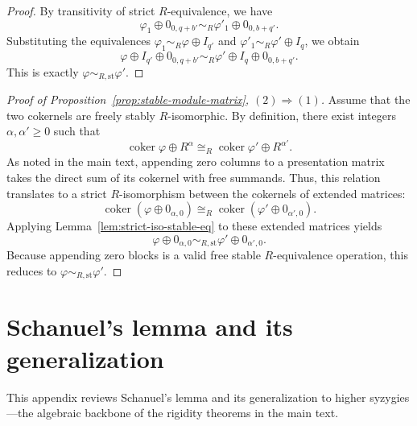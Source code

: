 \documentclass[aps,prx,english,superscriptaddress,twocolumn,tightenlines,showpacs,longbibliography,floatfix,amsfonts]{revtex4-2}
\theoremstyle{remark}
\theoremstyle{definition}
\begin{document}
\begin{proof}
	By transitivity of strict \(R\)-equivalence, we have
	\begin{equation}
		\varphi_1 \oplus 0_{0, q+b'} \sim_R \varphi'_1 \oplus 0_{0, b+q'}.
	\end{equation}
	Substituting the equivalences $\varphi_1 \sim_R \varphi \oplus I_{q'}$ and $\varphi'_1 \sim_R \varphi' \oplus I_q$, we obtain
	\begin{equation}
		\varphi \oplus I_{q'} \oplus 0_{0, q+b'} \sim_R \varphi' \oplus I_q \oplus 0_{0, b+q'}.
	\end{equation}
	This is exactly \(\varphi \sim_{R,\mathrm{st}} \varphi'\).
\end{proof}

\begin{proof}[Proof of Proposition~\ref{prop:stable-module-matrix}, $(2) \Rightarrow (1)$]
	Assume that the two cokernels are freely stably \(R\)-isomorphic. By
	definition, there exist integers
	$\alpha,\alpha'\geq0$ such that
	\begin{equation}
		\operatorname{coker}\varphi \oplus R^\alpha \cong_R \operatorname{coker}\varphi' \oplus R^{\alpha'}.
	\end{equation}
	As noted in the main text, appending zero columns to a presentation matrix takes the direct sum of its cokernel with free summands. Thus, this relation translates to a strict \(R\)-isomorphism between the cokernels of extended matrices:
	\begin{equation}
		\operatorname{coker}(\varphi \oplus 0_{\alpha, 0}) \cong_R \operatorname{coker}(\varphi' \oplus 0_{\alpha', 0}).
	\end{equation}
	Applying Lemma~\ref{lem:strict-iso-stable-eq} to these extended matrices yields
	\begin{equation}
		\varphi \oplus 0_{\alpha, 0} \sim_{R,\mathrm{st}} \varphi' \oplus 0_{\alpha', 0}.
	\end{equation}
	Because appending zero blocks is a valid free stable \(R\)-equivalence operation, this reduces to $\varphi \sim_{R,\mathrm{st}} \varphi'$.
\end{proof}

\section{Schanuel's lemma and its generalization}
\label{app:schanuel-lemma}

This appendix reviews Schanuel's lemma and its generalization to higher
syzygies---the algebraic backbone of the rigidity theorems in the main text.
\end{document}
